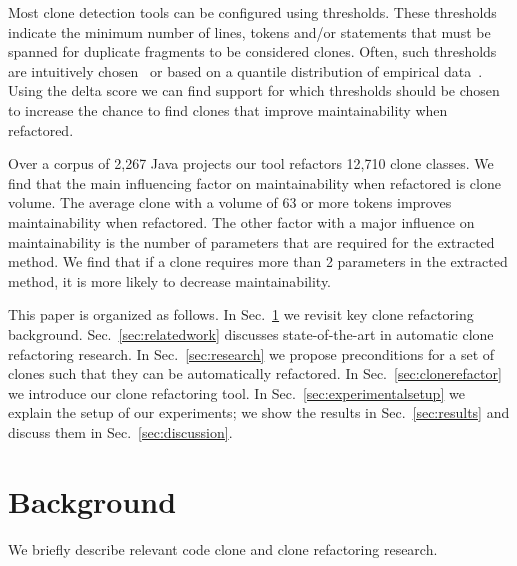 \documentclass[sigconf,review,anonymous]{acmart}
\begin{document}
Most clone detection tools can be configured using thresholds. These thresholds indicate the minimum number of lines, tokens and/or statements that must be spanned for duplicate fragments to be considered clones. Often, such thresholds are intuitively chosen~\cite{li2006cp, roy2009mutation} or based on a quantile distribution of empirical data~\cite{alves2010deriving}. Using the delta score we can find support for which thresholds should be chosen to increase the chance to find clones that improve maintainability when refactored.

Over a corpus of 2,267 Java projects our tool refactors 12,710 clone classes. We find that the main influencing factor on maintainability when refactored is clone volume. %
The average clone with a volume of 63 or more tokens improves maintainability when refactored. The other factor with a major influence on maintainability is the number of parameters that are required for the extracted method. We find that if a clone requires more than 2 parameters in the extracted method, it is more likely to decrease maintainability.

This paper is organized as follows. In Sec.~\ref{sec:background} we revisit key clone refactoring background. Sec.~\ref{sec:relatedwork} discusses state-of-the-art in automatic clone refactoring research. In Sec.~\ref{sec:research} we propose preconditions for a set of clones such that they can be automatically refactored. In Sec.~\ref{sec:clonerefactor} we introduce our clone refactoring tool. In Sec.~\ref{sec:experimentalsetup} we explain the setup of our experiments; we show the results in Sec.~\ref{sec:results} and discuss them in Sec.~\ref{sec:discussion}.

\section{Background}\label{sec:background}
We briefly describe relevant code clone and clone refactoring research.
\end{document}
